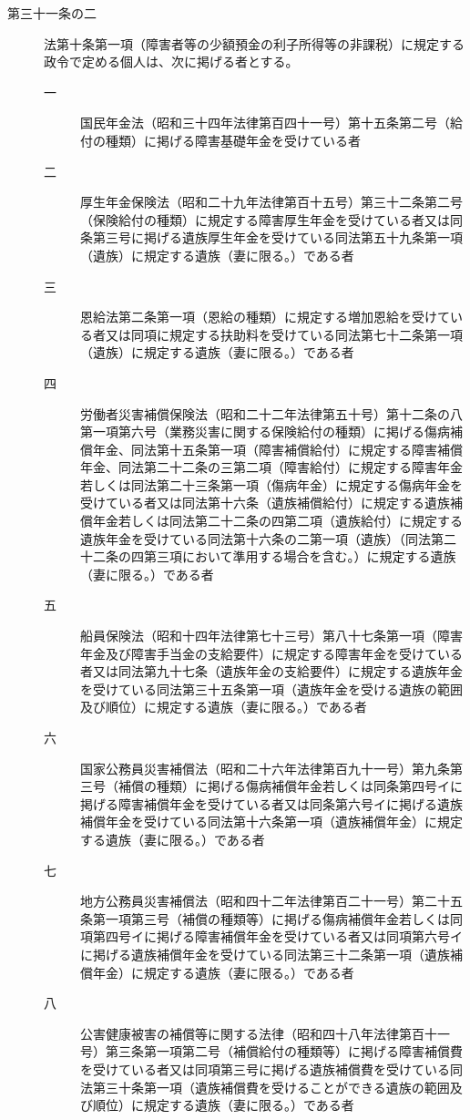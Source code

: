 \documentclass[twocolumn,a4j,10pt]{ltjtarticle}
\begin{document}
\begin{description}
\item[第三十一条の二]法第十条第一項（障害者等の少額預金の利子所得等の非課税）に規定する政令で定める個人は、次に掲げる者とする。
\begin{description}
\item[一]国民年金法（昭和三十四年法律第百四十一号）第十五条第二号（給付の種類）に掲げる障害基礎年金を受けている者
\item[二]厚生年金保険法（昭和二十九年法律第百十五号）第三十二条第二号（保険給付の種類）に規定する障害厚生年金を受けている者又は同条第三号に掲げる遺族厚生年金を受けている同法第五十九条第一項（遺族）に規定する遺族（妻に限る。）である者
\item[三]恩給法第二条第一項（恩給の種類）に規定する増加恩給を受けている者又は同項に規定する扶助料を受けている同法第七十二条第一項（遺族）に規定する遺族（妻に限る。）である者
\item[四]労働者災害補償保険法（昭和二十二年法律第五十号）第十二条の八第一項第六号（業務災害に関する保険給付の種類）に掲げる傷病補償年金、同法第十五条第一項（障害補償給付）に規定する障害補償年金、同法第二十二条の三第二項（障害給付）に規定する障害年金若しくは同法第二十三条第一項（傷病年金）に規定する傷病年金を受けている者又は同法第十六条（遺族補償給付）に規定する遺族補償年金若しくは同法第二十二条の四第二項（遺族給付）に規定する遺族年金を受けている同法第十六条の二第一項（遺族）（同法第二十二条の四第三項において準用する場合を含む。）に規定する遺族（妻に限る。）である者
\item[五]船員保険法（昭和十四年法律第七十三号）第八十七条第一項（障害年金及び障害手当金の支給要件）に規定する障害年金を受けている者又は同法第九十七条（遺族年金の支給要件）に規定する遺族年金を受けている同法第三十五条第一項（遺族年金を受ける遺族の範囲及び順位）に規定する遺族（妻に限る。）である者
\item[六]国家公務員災害補償法（昭和二十六年法律第百九十一号）第九条第三号（補償の種類）に掲げる傷病補償年金若しくは同条第四号イに掲げる障害補償年金を受けている者又は同条第六号イに掲げる遺族補償年金を受けている同法第十六条第一項（遺族補償年金）に規定する遺族（妻に限る。）である者
\item[七]地方公務員災害補償法（昭和四十二年法律第百二十一号）第二十五条第一項第三号（補償の種類等）に掲げる傷病補償年金若しくは同項第四号イに掲げる障害補償年金を受けている者又は同項第六号イに掲げる遺族補償年金を受けている同法第三十二条第一項（遺族補償年金）に規定する遺族（妻に限る。）である者
\item[八]公害健康被害の補償等に関する法律（昭和四十八年法律第百十一号）第三条第一項第二号（補償給付の種類等）に掲げる障害補償費を受けている者又は同項第三号に掲げる遺族補償費を受けている同法第三十条第一項（遺族補償費を受けることができる遺族の範囲及び順位）に規定する遺族（妻に限る。）である者

\end{description}
\end{description}
\end{document}

